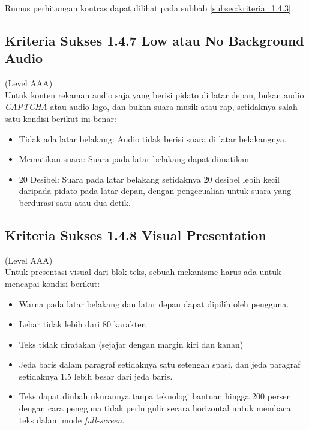 Rumus perhitungan kontras dapat dilihat pada subbab \ref{subsec:kriteria_1.4.3}.

\subsection{Kriteria Sukses 1.4.7 Low atau No Background Audio}
\label{subsec:kriteria_1.4.7}
(Level AAA) \\

Untuk konten rekaman audio saja yang berisi pidato di latar depan, bukan audio \textit{CAPTCHA} atau audio logo, dan bukan suara musik atau rap, setidaknya salah satu kondisi berikut ini benar: 

\begin{itemize}
	\item Tidak ada latar belakang: Audio tidak berisi suara di latar belakangnya.
	\item Mematikan suara: Suara pada latar belakang dapat dimatikan
	\item 20 Desibel: Suara pada latar belakang setidaknya 20 desibel lebih kecil daripada pidato pada latar depan, dengan pengecualian untuk suara yang berdurasi satu atau dua detik.
\end{itemize}

\subsection{Kriteria Sukses 1.4.8 Visual Presentation}
\label{subsec:kriteria_1.4.8}
(Level AAA) \\

Untuk presentasi visual dari blok teks, sebuah mekanisme harus ada untuk mencapai kondisi berikut:

\begin{itemize}
	\item Warna pada latar belakang dan latar depan dapat dipilih oleh pengguna.
	\item Lebar tidak lebih dari 80 karakter.
	\item Teks tidak diratakan (sejajar dengan margin kiri dan kanan)
	\item Jeda baris dalam paragraf setidaknya satu setengah spasi, dan jeda paragraf setidaknya 1.5 lebih besar dari jeda baris.
	\item Teks dapat diubah ukurannya tanpa teknologi bantuan hingga 200 persen dengan cara pengguna tidak perlu gulir secara horizontal untuk membaca teks dalam mode \textit{full-screen}.
\end{itemize}


